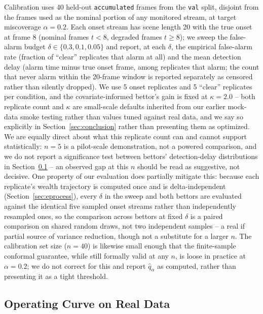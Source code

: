 Calibration uses 40 held-out \texttt{accumulated} frames from the \texttt{val} split, disjoint from the frames used as the nominal portion of any monitored stream, at target miscoverage $\alpha = 0.2$. Each onset stream has scene length 20 with the true onset at frame 8 (nominal frames $t < 8$, degraded frames $t \ge 8$); we sweep the false-alarm budget $\delta \in \{0.3, 0.1, 0.05\}$ and report, at each $\delta$, the empirical false-alarm rate (fraction of ``clear'' replicates that alarm at all) and the mean detection delay (alarm time minus true onset frame, among replicates that alarm; the count that never alarm within the 20-frame window is reported separately as censored rather than silently dropped). We use 5 onset replicates and 5 ``clear'' replicates per condition, and the covariate-informed bettor's gain is fixed at $\kappa = 2.0$ -- both replicate count and $\kappa$ are small-scale defaults inherited from our earlier mock-data smoke testing rather than values tuned against real data, and we say so explicitly in Section~\ref{sec:conclusion} rather than presenting them as optimized. We are equally direct about what this replicate count can and cannot support statistically: $n=5$ is a pilot-scale demonstration, not a powered comparison, and we do not report a significance test between bettors' detection-delay distributions in Section~\ref{sec:results} -- an observed gap at this $n$ should be read as suggestive, not decisive. One property of our evaluation does partially mitigate this: because each replicate's wealth trajectory is computed once and is delta-independent (Section~\ref{sec:eprocess}), every $\delta$ in the sweep and both bettors are evaluated against the identical five sampled onset streams rather than independently resampled ones, so the comparison across bettors at fixed $\delta$ is a paired comparison on shared random draws, not two independent samples -- a real if partial source of variance reduction, though not a substitute for a larger $n$. The calibration set size ($n=40$) is likewise small enough that the finite-sample conformal guarantee, while still formally valid at any $n$, is loose in practice at $\alpha=0.2$; we do not correct for this and report $\hat{q}_\alpha$ as computed, rather than presenting it as a tight threshold.

\subsection{Operating Curve on Real Data}
\label{sec:results}

